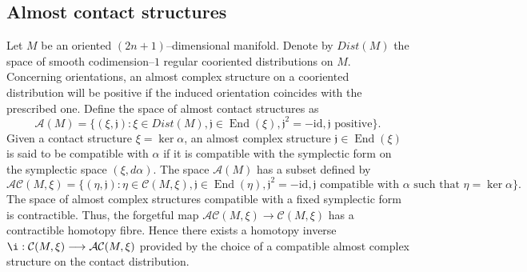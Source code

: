 \documentclass[10pt]{amsart}
\begin{document}
\subsection{Almost contact structures}
\noindent Let $M$ be an oriented $(2n+1)$--dimensional manifold. Denote by $Dist(M)$ the space of smooth codimension--$1$ regular cooriented distributions on $M$. Concerning orientations, an almost complex structure on a cooriented distribution will be positive if the induced orientation coincides with the prescribed one. Define the space of almost contact structures as
$${\mathcal{A}}(M)=\{(\xi,{\mathfrak{j}}):\xi\in Dist(M),{\mathfrak{j}}\in{\operatorname{End}}(\xi),{\mathfrak{j}}^2=-\mbox{id},{\mathfrak{j}}\mbox{ positive}\}.$$
Given a contact structure $\xi=\ker \alpha$, an almost complex structure ${\mathfrak{j}}\in{\operatorname{End}}(\xi)$ is said to be compatible with $\alpha$ if it is compatible with the symplectic form on the symplectic space $(\xi,d\alpha)$. The space ${\mathcal{A}}(M)$ has a subset defined by
$${\mathcal{A}}{\mathcal{C}}(M, \xi)=\{(\eta,{\mathfrak{j}}):\eta \in {\mathcal{C}}(M, \xi),{\mathfrak{j}}\in{\operatorname{End}}(\eta),{\mathfrak{j}}^2=-\mbox{id}, {\mathfrak{j}} \mbox{ compatible with }\alpha\mbox{ such that }\eta=\ker\alpha\}.$$
The space of almost complex structures compatible with a fixed symplectic form is contractible. Thus, the forgetful map ${\mathcal{A}}{\mathcal{C}}(M, \xi)\longrightarrow{\mathcal{C}}(M, \xi)$ has a contractible homotopy fibre. Hence there exists a homotopy inverse $\i:{\mathcal{C}}(M, \xi)\longrightarrow{\mathcal{A}}{\mathcal{C}}(M, \xi)$ provided by the choice of a compatible almost complex structure on the contact distribution.\\
\end{document}
